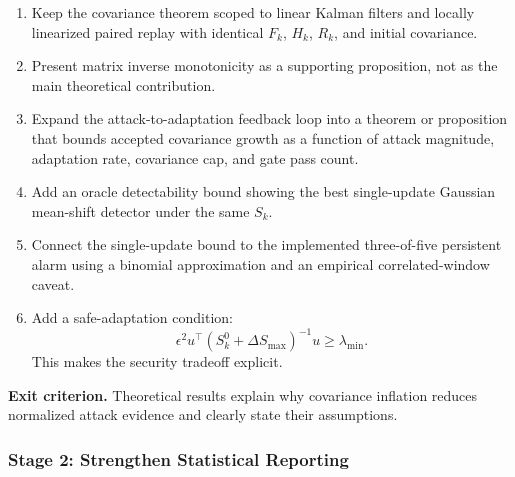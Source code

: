 \begin{enumerate}
    \item Keep the covariance theorem scoped to linear Kalman filters and
    locally linearized paired replay with identical $F_k$, $H_k$, $R_k$, and
    initial covariance.

    \item Present matrix inverse monotonicity as a supporting proposition,
    not as the main theoretical contribution.

    \item Expand the attack-to-adaptation feedback loop into a theorem or
    proposition that bounds accepted covariance growth as a function of attack
    magnitude, adaptation rate, covariance cap, and gate pass count.

    \item Add an oracle detectability bound showing the best single-update
    Gaussian mean-shift detector under the same $S_k$.

    \item Connect the single-update bound to the implemented three-of-five
    persistent alarm using a binomial approximation and an empirical
    correlated-window caveat.

    \item Add a safe-adaptation condition:
    \[
        \epsilon^2 u^\top(S_k^0+\Delta S_{\max})^{-1}u
        \geq \lambda_{\min}.
    \]
    This makes the security tradeoff explicit.
\end{enumerate}

\textbf{Exit criterion.} Theoretical results explain why covariance inflation
reduces normalized attack evidence and clearly state their assumptions.

\subsubsection{Stage 2: Strengthen Statistical Reporting}

